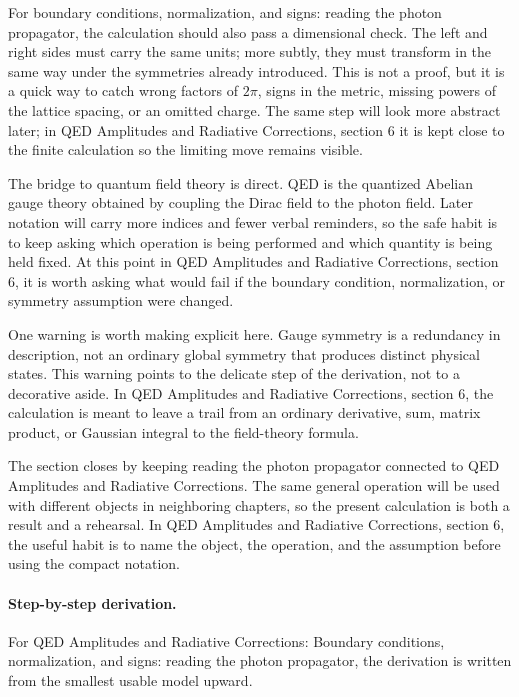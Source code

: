 For boundary conditions, normalization, and signs: reading the photon propagator, the calculation should also pass a dimensional check.  The left and right sides must carry the same units; more subtly, they must transform in the same way under the symmetries already introduced.  This is not a proof, but it is a quick way to catch wrong factors of \(2\pi\), signs in the metric, missing powers of the lattice spacing, or an omitted charge.  The same step will look more abstract later; in QED Amplitudes and Radiative Corrections, section 6 it is kept close to the finite calculation so the limiting move remains visible.

The bridge to quantum field theory is direct.  QED is the quantized Abelian gauge theory obtained by coupling the Dirac field to the photon field.  Later notation will carry more indices and fewer verbal reminders, so the safe habit is to keep asking which operation is being performed and which quantity is being held fixed.  At this point in QED Amplitudes and Radiative Corrections, section 6, it is worth asking what would fail if the boundary condition, normalization, or symmetry assumption were changed.

One warning is worth making explicit here.  Gauge symmetry is a redundancy in description, not an ordinary global symmetry that produces distinct physical states.  This warning points to the delicate step of the derivation, not to a decorative aside.  In QED Amplitudes and Radiative Corrections, section 6, the calculation is meant to leave a trail from an ordinary derivative, sum, matrix product, or Gaussian integral to the field-theory formula.

The section closes by keeping reading the photon propagator connected to QED Amplitudes and Radiative Corrections.  The same general operation will be used with different objects in neighboring chapters, so the present calculation is both a result and a rehearsal.  In QED Amplitudes and Radiative Corrections, section 6, the useful habit is to name the object, the operation, and the assumption before using the compact notation.



\paragraph{Step-by-step derivation.}

For QED Amplitudes and Radiative Corrections: Boundary conditions, normalization, and signs: reading the photon propagator, the derivation is written from the smallest usable model upward.

